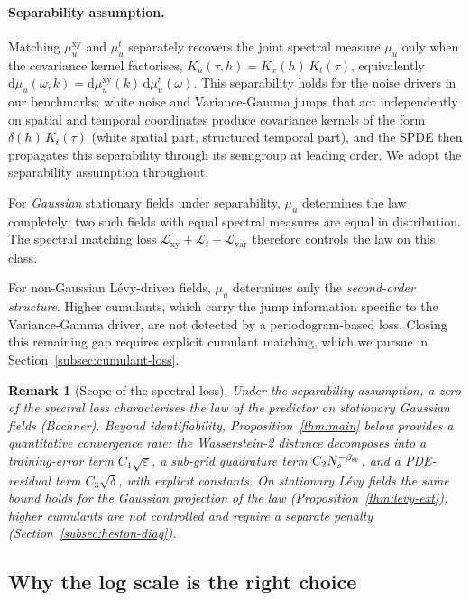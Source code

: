 \documentclass[review,12pt]{elsarticle}
\newtheorem{remark}{Remark}
\begin{document}
\paragraph{Separability assumption.}
Matching \(\mu^{\mathrm{xy}}_u\) and \(\mu^t_u\) separately
recovers the joint spectral measure \(\mu_u\) only when the
covariance kernel factorises, \(K_u(\tau, h) = K_x(h)\, K_t(\tau)\),
equivalently \(\mathrm d\mu_u(\omega, k) = \mathrm d\mu^{\mathrm{xy}}_u(k)\,
\mathrm d\mu^t_u(\omega)\). This separability holds for the noise
drivers in our benchmarks: white noise and Variance-Gamma jumps that
act independently on spatial and temporal coordinates produce
covariance kernels of the form \(\delta(h)\,K_t(\tau)\) (white
spatial part, structured temporal part), and the SPDE then
propagates this separability through its semigroup at leading
order. We adopt the separability assumption throughout.

For \emph{Gaussian} stationary fields under separability,
\(\mu_u\) determines the law completely: two such fields with
equal spectral measures are equal in distribution. The spectral
matching loss
\(\mathcal L_{\mathrm{xy}} + \mathcal L_t + \mathcal L_{\mathrm{var}}\)
therefore controls the law on this class.

For non-Gaussian L\'evy-driven fields, \(\mu_u\) determines only
the \emph{second-order structure}. Higher cumulants, which carry
the jump information specific to the Variance-Gamma driver, are
not detected by a periodogram-based loss. Closing this remaining
gap requires explicit cumulant matching, which we pursue in
Section~\ref{subsec:cumulant-loss}.

\begin{remark}[Scope of the spectral loss]
\label{rem:scope}
Under the separability assumption, a zero of the spectral loss
characterises the law of the predictor on stationary Gaussian fields
(Bochner). Beyond identifiability, Proposition~\ref{thm:main} below
provides a quantitative convergence rate: the Wasserstein-2 distance
decomposes into a training-error term \(C_1\sqrt{\varepsilon}\), a
sub-grid quadrature term \(C_2 N_s^{-\beta_{\rm sr}}\), and a PDE-residual
term \(C_3\sqrt{\delta}\), with explicit constants. On stationary
L\'evy fields the same bound holds for the Gaussian projection of the
law (Proposition~\ref{thm:levy-ext}); higher cumulants are not controlled
and require a separate penalty (Section~\ref{subsec:heston-diag}).
\end{remark}

\subsection{Why the log scale is the right choice}
\label{subsec:log-scale}
\end{document}
